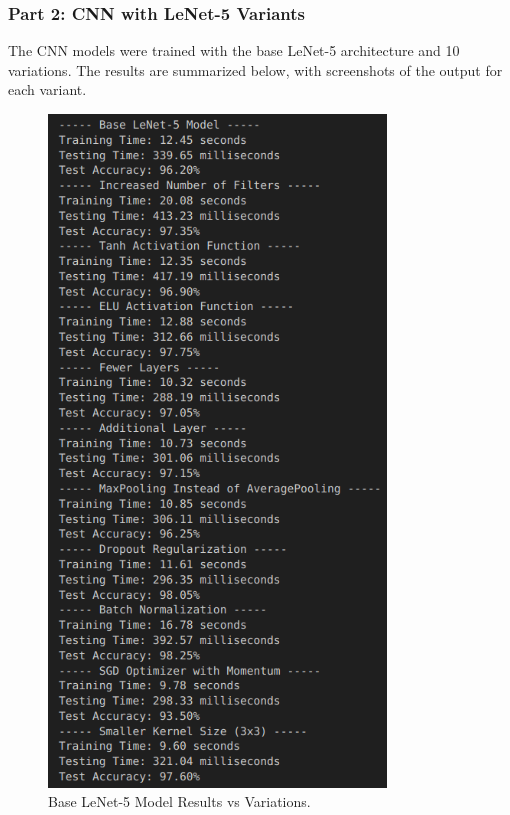 \documentclass[a4paper,12pt]{article}
\begin{document}
\subsubsection{Part 2: CNN with LeNet-5 Variants}
The CNN models were trained with the base LeNet-5 architecture and 10 variations. The results are summarized below, with screenshots of the output for each variant.

\begin{figure}[H]
    \centering
    \includegraphics[width=0.8\textwidth]{CNNvariations.png}
    \caption{Base LeNet-5 Model Results vs Variations.}
    \label{fig:cnn_base}
\end{figure}
\end{document}
